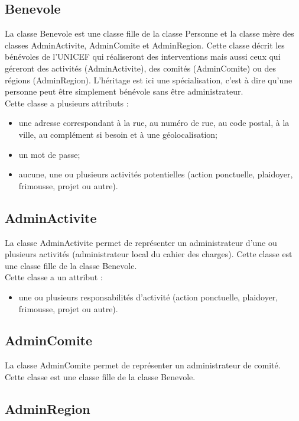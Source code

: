 \documentclass[asi, sansVersion]{picInsa}
\begin{document}
\subsection*{Benevole}

La classe Benevole est une classe fille de la classe Personne et la classe mère des classes AdminActivite, AdminComite et AdminRegion. Cette classe décrit les bénévoles de l'UNICEF qui réaliseront des interventions mais aussi ceux qui géreront des activités (AdminActivite), des comités (AdminComite) ou des régions (AdminRegion). L'héritage est ici une spécialisation, c'est à dire qu'une personne peut être simplement bénévole sans être administrateur. \\
Cette classe a plusieurs attributs : 
\begin{itemize}
\item une adresse correspondant à la rue, au numéro de rue, au code postal, à la ville, au complément si besoin et à une géolocalisation;
\item un mot de passe;
\item aucune, une ou plusieurs activités potentielles (action ponctuelle, plaidoyer, frimousse, projet ou autre).
\end{itemize}

\subsection*{AdminActivite}

La classe AdminActivite permet de représenter un administrateur d'une ou plusieurs activités (administrateur local du cahier des charges). Cette classe est une classe fille de la classe Benevole.\\
Cette classe a un attribut :
\begin{itemize}
\item une ou plusieurs responsabilités d'activité (action ponctuelle, plaidoyer, frimousse, projet ou autre). 
\end{itemize}

\subsection*{AdminComite}

La classe AdminComite permet de représenter un administrateur de comité. Cette classe est une classe fille de la classe Benevole. 

\subsection*{AdminRegion}
\end{document}
